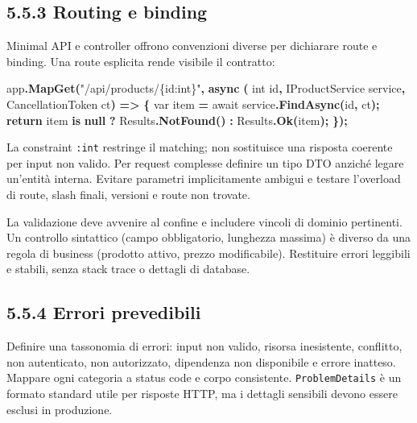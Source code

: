 \documentclass[
  italian,
  10pt,
]{book}
\newenvironment{Shaded}{\begin{snugshade}}{\end{snugshade}}
\newcommand{\DataTypeTok}[1]{\textcolor[rgb]{0.13,0.29,0.53}{#1}}
\newcommand{\FunctionTok}[1]{\textcolor[rgb]{0.13,0.29,0.53}{\textbf{#1}}}
\newcommand{\KeywordTok}[1]{\textcolor[rgb]{0.13,0.29,0.53}{\textbf{#1}}}
\newcommand{\NormalTok}[1]{#1}
\newcommand{\OperatorTok}[1]{\textcolor[rgb]{0.81,0.36,0.00}{\textbf{#1}}}
\newcommand{\StringTok}[1]{\textcolor[rgb]{0.31,0.60,0.02}{#1}}
\begin{document}
\subsection{5.5.3 Routing e binding}\label{routing-e-binding}

Minimal API e controller offrono convenzioni diverse per dichiarare
route e binding. Una route esplicita rende visibile il contratto:

\begin{Shaded}
\begin{Highlighting}[]
\NormalTok{app}\OperatorTok{.}\FunctionTok{MapGet}\OperatorTok{(}\StringTok{"/api/products/\{id:int\}"}\OperatorTok{,} \FunctionTok{async} \OperatorTok{(}
    \DataTypeTok{int}\NormalTok{ id}\OperatorTok{,}\NormalTok{ IProductService service}\OperatorTok{,}\NormalTok{ CancellationToken ct}\OperatorTok{)} \OperatorTok{=\textgreater{}}
\OperatorTok{\{}
    \DataTypeTok{var}\NormalTok{ item }\OperatorTok{=}\NormalTok{ await service}\OperatorTok{.}\FunctionTok{FindAsync}\OperatorTok{(}\NormalTok{id}\OperatorTok{,}\NormalTok{ ct}\OperatorTok{);}
    \KeywordTok{return}\NormalTok{ item }\KeywordTok{is} \KeywordTok{null}
        \OperatorTok{?}\NormalTok{ Results}\OperatorTok{.}\FunctionTok{NotFound}\OperatorTok{()}
        \OperatorTok{:}\NormalTok{ Results}\OperatorTok{.}\FunctionTok{Ok}\OperatorTok{(}\NormalTok{item}\OperatorTok{);}
\OperatorTok{\});}
\end{Highlighting}
\end{Shaded}

La constraint \texttt{:int} restringe il matching; non sostituisce una
risposta coerente per input non valido. Per request complesse definire
un tipo DTO anziché legare un'entità interna. Evitare parametri
implicitamente ambigui e testare l'overload di route, slash finali,
versioni e route non trovate.

La validazione deve avvenire al confine e includere vincoli di dominio
pertinenti. Un controllo sintattico (campo obbligatorio, lunghezza
massima) è diverso da una regola di business (prodotto attivo, prezzo
modificabile). Restituire errori leggibili e stabili, senza stack trace
o dettagli di database.

\subsection{5.5.4 Errori prevedibili}\label{errori-prevedibili}

Definire una tassonomia di errori: input non valido, risorsa
inesistente, conflitto, non autenticato, non autorizzato, dipendenza non
disponibile e errore inatteso. Mappare ogni categoria a status code e
corpo consistente. \texttt{ProblemDetails} è un formato standard utile
per risposte HTTP, ma i dettagli sensibili devono essere esclusi in
produzione.
\end{document}
